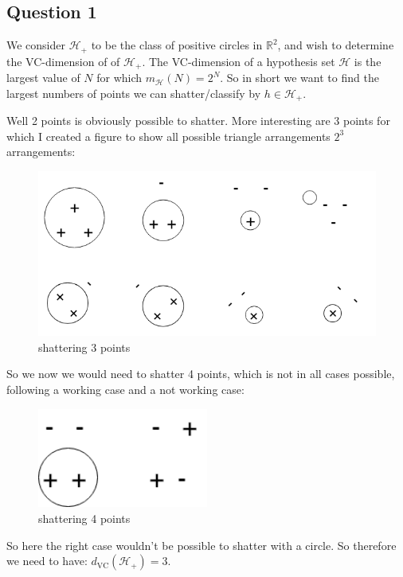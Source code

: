 \subsection{Question 1}
We consider $\mathcal{H}_+$ to be the class of positive circles in $\mathbb{R}^2$, and wish to determine the VC-dimension of of $\mathcal{H}_+$. The VC-dimension of a hypothesis set $\mathcal{H}$ is the largest value of $N$ for which $m_{\mathcal{H}}(N)=2^N$.
 	So in short we want to find the largest numbers of points we can shatter/classify by $h \in \mathcal{H}_+$.

Well 2 points is obviously possible to shatter.
More interesting are 3 points for which I created a figure to show all possible triangle arrangements $2^3$ arrangements:

\begin{figure}[!htb]
	\center
	\includegraphics[width=\textwidth]{vc_dimension/vc-dimension}
	\caption{shattering 3 points}
\end{figure}

So we now we would need to shatter 4 points, which is not in all cases possible, following a working case and a not working case:

\begin{figure}[!htb]
		\center
	\includegraphics[width=0.5\textwidth]{vc_dimension/vc-dimension-2}
	\caption{shattering 4 points}
\end{figure}

So here the right case wouldn't be possible to shatter with a circle.
So therefore we need to have: $d_{\text{VC}}(\mathcal{H}_+)=3$.
